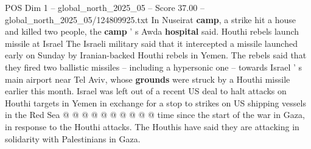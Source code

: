 \begin{textsample}{POS Dim 1 – global\_north\_2025\_05 – Score 37.00 – global\_north\_2025\_05/124809925.txt}
In Nuseirat \textbf{camp}, a strike hit a house and killed two people, the \textbf{camp} ' s Awda \textbf{hospital} said.
Houthi rebels launch missile at Israel The Israeli military said that it intercepted a missile launched early on Sunday by Iranian-backed Houthi rebels in Yemen.
The rebels said that they fired two ballistic missiles -- including a hypersonic one -- towards Israel ' s main airport near Tel Aviv, whose \textbf{grounds} were struck by a Houthi missile earlier this month.
Israel was left out of a recent US deal to halt attacks on Houthi targets in Yemen in exchange for a stop to strikes on US shipping vessels in the Red Sea @ @ @ @ @ @ @ @ @ @ time since the start of the war in Gaza, in response to the Houthi attacks.
The Houthis have said they are attacking in solidarity with Palestinians in Gaza.

\end{textsample}
